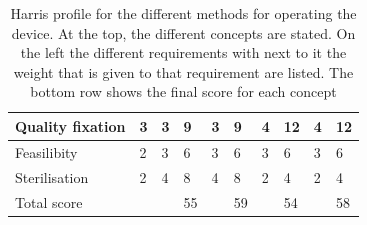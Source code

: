 \documentclass[whitelogo]{tudelft-report}
\begin{document}
{{{\begin{table}[!tbh]
\begin{tabular}{|l|l|l|l|l|l|l|l|l|l|}
		Quality fixation        & 3         & 3                                                     & 9    & 3                                                       & 9     & 4                                                      & 12     & 4                                                       & 12     \\ \hline
		Feasilibity             & 2         & 3                                                     & 6     & 3                                                       & 6     & 3                                                      & 6     & 3                                                       & 6     \\ \hline
		Sterilisation           & 2         & 4                                                     & 8     & 4                                                       & 8     & 2                                                      & 4     & 2                                                       & 4     \\ \hline
		Total score             &           &                                                       & 55    &                                                         & 59    &                                                        & 54    &                                                         & 58    \\ \hline
	\end{tabular}
	\caption{Harris profile for the different methods for operating the device. At the top, the different concepts are stated. On the left the different requirements with next to it the weight that is given to that requirement are listed. The bottom row shows the final score for each concept}
	\label{table:draglift1}
\end{table}

}}}
\end{document}
